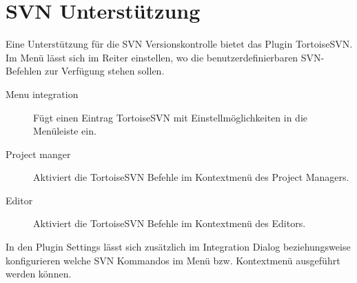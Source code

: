\section{SVN Unterstützung}\label{sec:svn}

Eine Unterstützung für die SVN Versionskontrolle bietet das \codeblocks Plugin TortoiseSVN. Im Menü  lässt sich im Reiter  einstellen, wo die benutzerdefinierbaren SVN-Befehlen zur Verfügung stehen sollen.

\begin{description}
\item[Menu integration] Fügt einen Eintrag TortoiseSVN mit Einstellmöglichkeiten in die Menüleiste ein.
\item[Project manger] Aktiviert die TortoiseSVN Befehle im Kontextmenü des Project Managers.
\item[Editor] Aktiviert die TortoiseSVN Befehle im Kontextmenü des Editors.
\end{description}

In den Plugin Settings lässt sich zusätzlich im Integration Dialog  beziehungsweise  konfigurieren welche SVN Kommandos im Menü bzw. Kontextmenü ausgeführt werden können.

